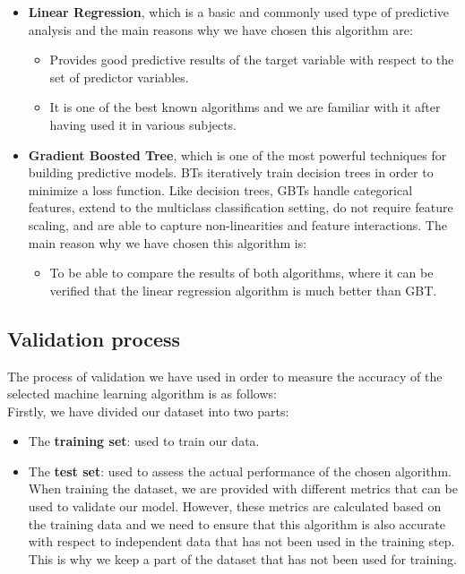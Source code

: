 \begin{itemize}

	\item \textbf{Linear Regression}, which is a basic and commonly used type of predictive analysis and the main reasons why we have chosen this algorithm are:

	\begin{itemize}
		\item Provides good predictive results of the target variable with respect to the set of predictor variables.
		
		\item It is one of the best known algorithms and we are familiar with it after having used it in various subjects.
	\end{itemize}		
	
	\item \textbf{Gradient Boosted Tree}, which is one of the most powerful techniques for building predictive models. BTs iteratively train decision trees in order to minimize a loss function. Like decision trees, GBTs handle categorical features, extend to the multiclass classification setting, do not require feature scaling, and are able to capture non-linearities and feature interactions. The main reason why we have chosen this algorithm is:
	
		\begin{itemize}
			\item To be able to compare the results of both algorithms, where it can be verified that the linear regression algorithm is much better than GBT.
		\end{itemize}	
	
\end{itemize}

\subsection{Validation process}

The process of validation we have used in order to measure the accuracy of the selected machine learning algorithm is as follows:\\

Firstly, we have divided our dataset into two parts:

		\begin{itemize}
			\item The \textbf{training set}: used to train our data. 
			\item The \textbf{test set}: used to assess the actual performance of the chosen algorithm. When training the dataset, we are provided with different metrics that can be used to validate our model. However, these metrics are calculated based on the training data and we need to ensure that this algorithm is also accurate with respect to independent data that has not been used in the training step. This is why we keep a part of the dataset that has not been used for training.
		\end{itemize}
		
